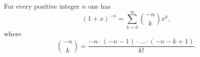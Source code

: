 \begin{thm}
\label{thm:BinomNeg}
For every positive integer $n$ one has
\begin{equation}
\label{eqn:BinomNeg}
(1+x)^{-n} = \sum_{k=0}^\infty \binom{-n}{k} x^k,
\end{equation}
where
\[
\binom{-n}{k} = \frac{-n \cdot (-n-1) \cdot \ldots \cdot (-n-k+1)}{k!}.
\]
\end{thm}